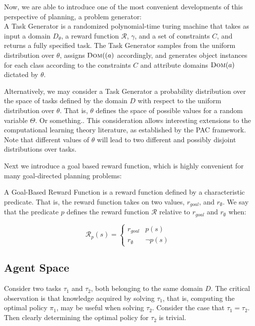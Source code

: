 \documentclass[11pt]{article}
\begin{document}
Now, we are able to introduce one of the most convenient developments of this perspective of planning, a problem generator: \\

{ A \textup{Task Generator} is a randomized polynomial-time turing machine that takes as input a domain $D_\theta$, a reward function $\mathcal{R}$, $\gamma$, and a set of constraints $C$, and returns a fully specified task. The Task Generator samples from the uniform distribution over $\theta$, assigns $\textsc{Dom}((a)$ accordingly, and generates object instances for each class according to the constraints $C$ and attribute domains $\textsc{Dom}(a)$ dictated by $\theta$.}

Alternatively, we may consider a Task Generator a probability distribution over the space of tasks defined by the domain $D$ with respect to the uniform distribution over $\theta$. That is, $\theta$ defines the space of possible values for a random variable $\Theta$. Or something.. This consideration allows interesting extensions to the computational learning theory literature, as established by the PAC framework. Note that different values of $\theta$ will lead to two different and possibly disjoint distributions over tasks.


Next we introduce a goal based reward function, which is highly convenient for many goal-directed planning problems: \\

{ A \textup{Goal-Based Reward Function} is a reward function defined by a characteristic predicate. That is, the reward function takes on two values, $r_{goal}$, and $r_{\emptyset}$. We say that the predicate $p$ defines the reward function $\mathcal{R}$ relative to $r_{goal}$ and $r_\emptyset$ when:

\begin{equation}
\mathcal{R}_p(s) = \begin{cases}
r_{goal}& p(s) \\
r_{\emptyset}&\neg p(s)
\end{cases}
\end{equation}}


\subsection{Agent Space}
Consider two tasks $\tau_1$ and $\tau_2$, both belonging to the same domain $D$. The critical observation is that knowledge acquired by solving $\tau_1$, that is, computing the optimal policy $\pi_1$, may be useful when solving $\tau_2$. Consider the case that $\tau_1 = \tau_2$. Then clearly determining the optimal policy for $\tau_2$ is trivial.
\end{document}
